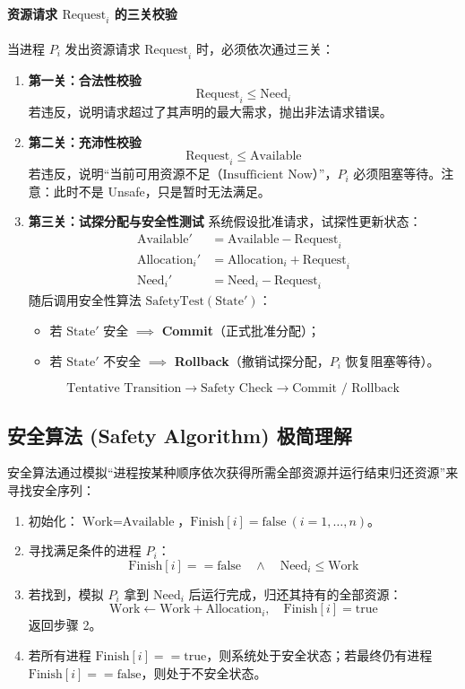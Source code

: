 \documentclass[11pt,a4paper]{ctexart}
\newcommand{\kw}[1]{\textbf{#1}}
\begin{document}
\paragraph{资源请求 $\text{Request}_i$ 的三关校验}
当进程 $P_i$ 发出资源请求 $\text{Request}_i$ 时，必须依次通过三关：

\begin{enumerate}
\item \kw{第一关：合法性校验}
\[
\text{Request}_i \le \text{Need}_i
\]
若违反，说明请求超过了其声明的最大需求，抛出非法请求错误。

\item \kw{第二关：充沛性校验}
\[
\text{Request}_i \le \text{Available}
\]
若违反，说明“当前可用资源不足（$\boxed{\text{Insufficient Now}}$）”，$P_i$ 必须阻塞等待。注意：此时不是 Unsafe，只是暂时无法满足。

\item \kw{第三关：试探分配与安全性测试}
系统假设批准请求，试探性更新状态：
\[
\begin{aligned}
\text{Available}' &= \text{Available} - \text{Request}_i \\
\text{Allocation}_i' &= \text{Allocation}_i + \text{Request}_i \\
\text{Need}_i' &= \text{Need}_i - \text{Request}_i
\end{aligned}
\]
随后调用安全性算法 $\boxed{\text{SafetyTest}(\text{State}')}$：
\begin{itemize}
\item 若 $\text{State}'$ 安全 $\implies$ \kw{Commit}（正式批准分配）；
\item 若 $\text{State}'$ 不安全 $\implies$ \kw{Rollback}（撤销试探分配，$P_i$ 恢复阻塞等待）。
\end{itemize}
\end{enumerate}

\[
\boxed{
\text{Tentative Transition}
\rightarrow
\text{Safety Check}
\rightarrow
\text{Commit / Rollback}
}
\]

\subsection{安全算法 (Safety Algorithm) 极简理解}

安全算法通过模拟“进程按某种顺序依次获得所需全部资源并运行结束归还资源”来寻找安全序列：

\begin{enumerate}
\item 初始化：$\text{Work} = \text{Available}$，$\text{Finish}[i] = \text{false} \ (i=1,\dots,n)$。
\item 寻找满足条件的进程 $P_i$：
\[
\text{Finish}[i] == \text{false} \quad \land \quad \text{Need}_i \le \text{Work}
\]
\item 若找到，模拟 $P_i$ 拿到 $\text{Need}_i$ 后运行完成，归还其持有的全部资源：
\[
\text{Work} \leftarrow \text{Work} + \text{Allocation}_i, \quad \text{Finish}[i] = \text{true}
\]
返回步骤 2。
\item 若所有进程 $\text{Finish}[i] == \text{true}$，则系统处于安全状态；若最终仍有进程 $\text{Finish}[i] == \text{false}$，则处于不安全状态。
\end{enumerate}
\end{document}
